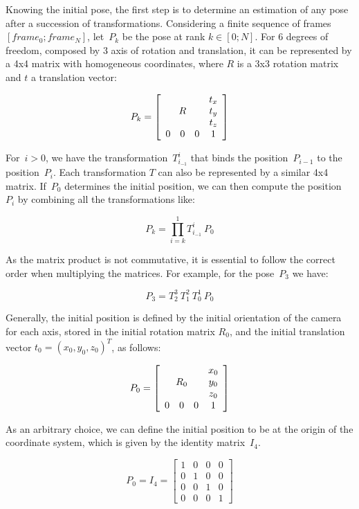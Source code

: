Knowing the initial pose, the first step is to determine an estimation of any pose after a succession of transformations. Considering a finite sequence of frames $[frame_0 ; frame_N]$, let~$P_k$ be the pose at rank $k \in [0;N]$. For 6 degrees of freedom, composed by 3 axis of rotation and translation, it can be represented by a 4x4 matrix with homogeneous coordinates, where $R$ is a 3x3 rotation matrix and $t$ a translation vector:

$$
P_k = \left[ \begin{array}{cccc}
 \multicolumn{3}{c}{\multirow{3}{*}{$R$}} & t_x \\
 & & & t_y \\
 & & & t_z \\
0 & 0 & 0 & 1 \end{array} \right] 
$$

For~$i>0$, we have the transformation~$T_{i_{-1}}^i$ that binds the position~$P_{i-1}$ to the position~$P_i$. Each transformation $T$ can also be represented by a similar 4x4 matrix. If~$P_0$ determines the initial position, we can then compute the position~$P_i$  by combining all the transformations like:

\begin{equation}
P_k = \prod_{i=k}^1{T_{i_{-1}}^i} \: P_0
\label{eqn:pose_estimation}
\end{equation}

As the matrix product is not commutative, it is essential to follow the correct order when multiplying the matrices. For example, for the pose~$P_3$ we have:

\[
P_3 = T_2^3 \: T_1^2 \: T_0^1 \: P_0
\]

Generally, the initial position is defined by the initial orientation of the camera for each axis, stored in the initial rotation matrix $R_0$, and the initial translation vector $t_0 = (x_0, y_0, z_0)^T$, as follows:

\[
P_0 = \left[ \begin{array}{cccc}
 \multicolumn{3}{c}{\multirow{3}{*}{$R_0$}} & x_0 \\
 & & & y_0 \\
 & & & z_0 \\
0 & 0 & 0 & 1 \end{array} \right] 
\]

As an arbitrary choice, we can define the initial position to be at the origin of the coordinate system, which is given by the identity matrix~$I_4$.

\[
P_0 = I_4 = \left[ \begin{array}{cccc}
1 & 0 & 0 & 0 \\
0 & 1 & 0 & 0 \\
0 & 0 & 1 & 0 \\
0 & 0 & 0 & 1 \end{array} \right] 
\]

